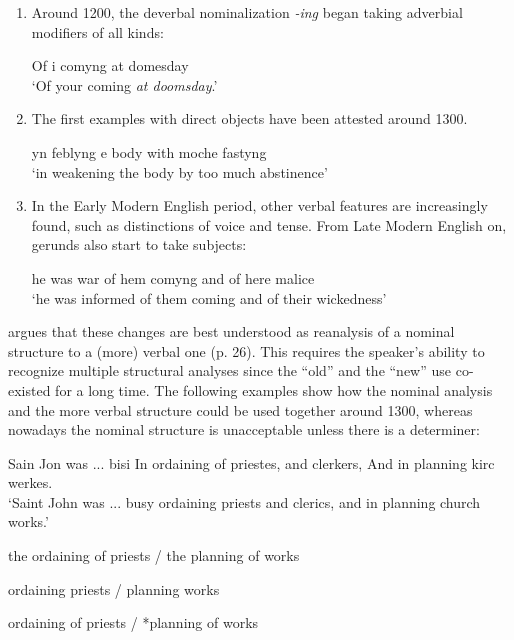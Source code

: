 \begin{enumerate}
\item Around 1200, the deverbal nominalization \emph{-ing} began taking adverbial modifiers of all kinds:

\ea
Of \th i comyng at domesday\\
`Of your coming \emph{at doomsday}.'
\z

\item The first examples with direct objects have been attested around 1300.

\ea
yn feblyng \th e body with moche fastyng\\ 
`in weakening the body by too much abstinence'
\z

\item In the Early Modern English period, other verbal features are increasingly found, such as distinctions of voice and tense. From Late Modern English on, gerunds also start to take subjects:

\ea 
he was war of hem comyng and of here malice \\
`he was informed of them coming and of their wickedness'
\z
\end{enumerate}

\citet{fanego04reanalysis} argues that these changes are best understood as reanalysis of a nominal structure to a (more) verbal one (p. 26). This requires the speaker's ability to recognize multiple structural analyses since the ``old'' and the ``new'' use co-existed for a long time. The following examples show how the nominal analysis and the more verbal structure could be used together around 1300, whereas nowadays the nominal structure is unacceptable unless there is a determiner:

\ea
\label{e:gerund-last}
Sain Jon was ... bisi In ordaining of priestes, and clerkers, And in planning kirc werkes.\\
`Saint John was ... busy ordaining priests and clerics, and in planning church works.'

\item the ordaining of priests / the planning of works
\item ordaining priests / planning works
\item *ordaining of priests / *planning of works
\z

